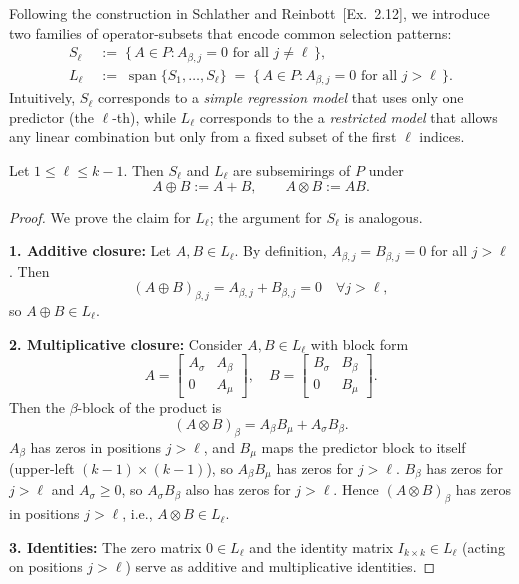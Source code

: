 \begin{defn}
Following the construction in Schlather and Reinbott~\cite{reinbott2021}[Ex.\ 2.12], we introduce two families of operator-subsets that encode common selection patterns:
\[
\begin{aligned}
S_\ell &\;:=\; \{\, A\in P : A_{\beta,j}=0 \text{ for all } j\neq \ell \,\}, \\[3pt]
L_\ell &\;:=\; \operatorname{span}\{ S_1,\dots,S_\ell\}
      \;=\; \{\, A\in P : A_{\beta,j}=0 \text{ for all } j>\ell \,\}.
\end{aligned}
\]
Intuitively, \(S_\ell\) corresponds to a \emph{simple regression model} that uses only one predictor (the $\ell$-th), while \(L_\ell\) corresponds to the a \emph{restricted model} that allows any linear combination but only from a fixed subset of the first \(\ell\) indices.
\end{defn}

\begin{prop}
Let $1 \le \ell \le k-1$. Then $S_\ell$ and $L_\ell$ are subsemirings of $P$ under
\[
A \oplus B := A + B, \qquad A \otimes B := AB.
\]
\end{prop}

\begin{proof}
We prove the claim for $L_\ell$; the argument for $S_\ell$ is analogous.

\textbf{1. Additive closure:}  
Let $A, B \in L_\ell$. By definition, $A_{\beta,j} = B_{\beta,j} = 0$ for all $j > \ell$. Then
\[
(A \oplus B)_{\beta,j} = A_{\beta,j} + B_{\beta,j} = 0 \quad \forall j > \ell,
\]
so $A \oplus B \in L_\ell$.

\textbf{2. Multiplicative closure:}  
Consider $A, B \in L_\ell$ with block form
\[
A = \begin{bmatrix} A_\sigma & A_\beta \\ 0 & A_\mu \end{bmatrix}, \quad
B = \begin{bmatrix} B_\sigma & B_\beta \\ 0 & B_\mu \end{bmatrix}.
\]
Then the $\beta$-block of the product is
\[
(A \otimes B)_\beta = A_\beta B_\mu + A_\sigma B_\beta.
\]
$A_\beta$ has zeros in positions $j>\ell$, and $B_\mu$ maps the predictor block to itself (upper-left $(k-1)\times(k-1)$), so $A_\beta B_\mu$ has zeros for $j>\ell$. $B_\beta$ has zeros for $j>\ell$ and $A_\sigma \ge 0$, so $A_\sigma B_\beta$ also has zeros for $j>\ell$. Hence $(A \otimes B)_\beta$ has zeros in positions $j>\ell$, i.e., $A \otimes B \in L_\ell$.

\textbf{3. Identities:}  
The zero matrix $0 \in L_\ell$ and the identity matrix $I_{k\times k} \in L_\ell$ (acting on positions $j>\ell$) serve as additive and multiplicative identities.
\end{proof}

